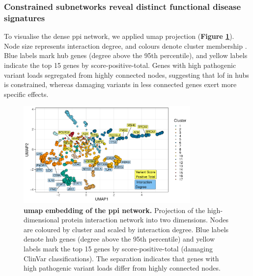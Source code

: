 \FloatBarrier
\subsubsection*{Constrained subnetworks reveal distinct functional disease signatures}

To visualise the dense \ac{ppi} network, we applied \ac{umap} projection (\textbf{Figure \ref{fig:p_umap}}). 
Node size represents interaction degree, and colours denote cluster membership \cite{szklarczyk2025string}. 
Blue labels mark hub genes (degree above the 95th percentile), and yellow labels indicate the top 15 genes by score-positive-total. 
Genes with high pathogenic variant loads segregated from highly connected nodes, suggesting that \ac{lof} in hubs is constrained, whereas damaging variants in less connected genes exert more specific effects.

\begin{figure}[ht]
  \centering
  \includegraphics[width=0.8\textwidth]{../images/untangleR_ppi_network_umap.pdf}
  \caption{
    \textbf{\ac{umap} embedding of the \ac{ppi} network.} 
    Projection of the high-dimensional protein interaction network into two dimensions. Nodes are coloured by cluster and scaled by interaction degree. Blue labels denote hub genes (degree above the 95th percentile) and yellow labels mark the top 15 genes by score-positive-total (damaging ClinVar classifications). The separation indicates that genes with high pathogenic variant loads differ from highly connected nodes.
  }
  \label{fig:p_umap}
\end{figure}

\FloatBarrier

